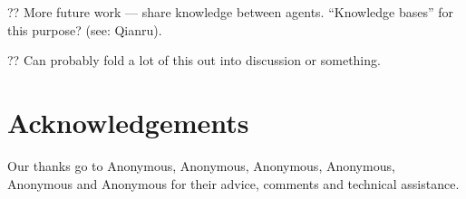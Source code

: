 \documentclass[conference, letterpaper, 10pt, times]{IEEEtran}
\begin{document}
?? More future work --- share knowledge between agents. ``Knowledge bases'' for this purpose? (see: Qianru).

?? Can probably fold a lot of this out into discussion or something.

\section*{Acknowledgements}
Our thanks go to Anonymous, Anonymous, Anonymous, Anonymous, Anonymous and Anonymous for their advice, comments and technical assistance.

\renewcommand*{\bibfont}{\small}
\printbibliography
\end{document}
